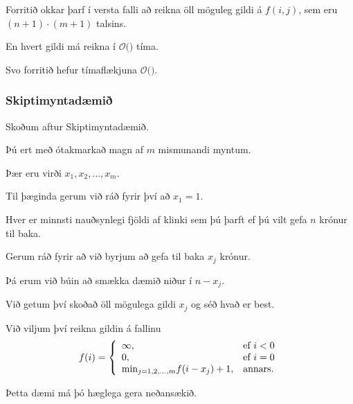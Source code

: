 {
    {
        \item<1-> Forritið okkar þarf í versta falli að reikna öll möguleg gildi á $f(i, j)$, sem eru $(n + 1) \cdot (m + 1)$ talsins.
            \item<2-> En hvert gildi má reikna í $\mathcal{O}($$)$ tíma.
            \item<4-> Svo forritið hefur tímaflækjuna $\mathcal{O}($$)$.
    }
}

{
    \frametitle{Skiptimyntadæmið}
    {
        \item<1-> Skoðum aftur Skiptimyntadæmið.
            \item<2-> Þú ert með ótakmarkað magn af $m$ mismunandi myntum.
            \item<3-> Þær eru virði $x_1, x_2, ..., x_m$.
            \item<4-> Til þæginda gerum við ráð fyrir því að $x_1 = 1$.
            \item<5-> Hver er minnsti nauðsynlegi fjöldi af klinki sem þú þarft ef þú vilt gefa $n$ krónur til baka.
    }
}

{
    {
        \item<1-> Gerum ráð fyrir að við byrjum að gefa til baka $x_j$ krónur.
            \item<2-> Þá erum við búin að smækka dæmið niður í $n - x_j$.
            \item<3-> Við getum því skoðað öll mögulega gildi $x_j$ og séð hvað er best.
            \item<4-> Við viljum því reikna gildin á fallinu
            \[
            f(i) = 
                \left \{
                \env{array}
        {
            {l l}
            \infty, & \text{ef $i < 0$}\\
                0, & \text{ef $i = 0$}\\
                \text{min}_{j = 1, 2, ..., m} f(i - x_j) + 1, & \text{annars}.
        }
        \right .
            \]
    }
}

{
}

{
    {
        \item<1-> Þetta dæmi má þó hæglega gera neðansækið.
    }
}

{
}

